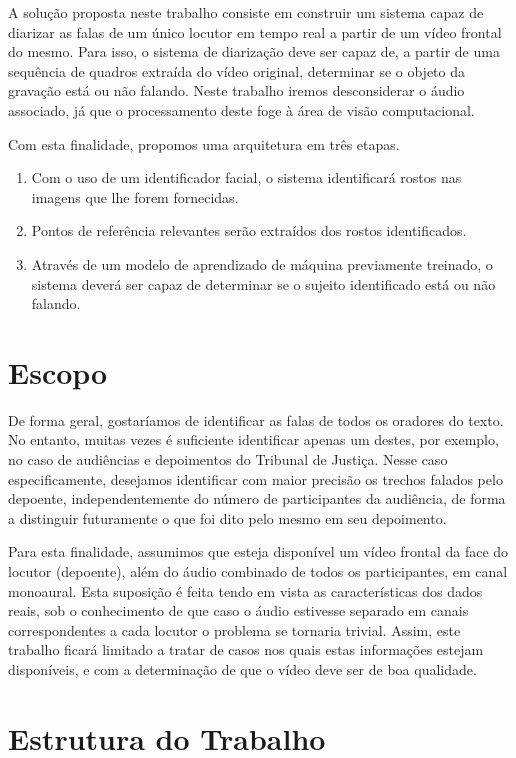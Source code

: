 A solução proposta neste trabalho consiste em construir um sistema capaz de diarizar as falas de um único locutor em tempo real a partir de um vídeo frontal do mesmo. Para isso, o sistema de diarização deve ser capaz de, a partir de uma sequência de quadros extraída do vídeo original, determinar se o objeto da gravação está ou não falando. Neste trabalho iremos desconsiderar o áudio associado, já que o processamento deste foge à área de visão computacional.

Com esta finalidade, propomos uma arquitetura em três etapas. 
\begin{enumerate}
    \item Com o uso de um identificador facial, o sistema identificará rostos nas imagens que lhe forem fornecidas. 
    \item Pontos de referência relevantes serão extraídos dos rostos identificados. 
    \item Através de um modelo de aprendizado de máquina previamente treinado, o sistema deverá ser capaz de determinar se o sujeito identificado está ou não falando.
\end{enumerate}

\section{Escopo}
\label{sec:scope}

De forma geral, gostaríamos de identificar as falas de todos os oradores do texto. No entanto, muitas vezes é suficiente identificar apenas um destes, por exemplo, no caso de audiências e depoimentos do Tribunal de Justiça. Nesse caso especificamente, desejamos identificar com maior precisão os trechos falados pelo depoente, independentemente do número de participantes da audiência, de forma a distinguir futuramente o que foi dito pelo mesmo em seu depoimento.

Para esta finalidade, assumimos que esteja disponível um vídeo frontal da face do locutor (depoente), além do áudio combinado de todos os participantes, em canal monoaural. Esta suposição é feita tendo em vista as características dos dados reais, sob o conhecimento de que caso o áudio estivesse separado em canais correspondentes a cada locutor o problema se tornaria trivial. Assim, este trabalho ficará limitado a tratar de casos nos quais estas informações estejam disponíveis, e com a determinação de que o vídeo deve ser de boa qualidade.

\section{Estrutura do Trabalho}
\label{sec:structure}

